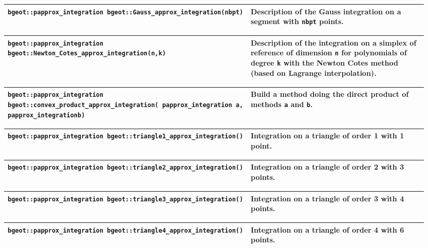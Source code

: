 \begin{center} \begin{tabular}{|m{0.55\linewidth}|m{0.4\linewidth}|} \hline
{\tt bgeot::papprox\_integration bgeot::Gauss\_approx\_integration(nbpt)} & Description of the Gauss integration on a segment with {\tt nbpt} points. \\ \hline
\end{tabular}  
\begin{tabular}{|m{0.55\linewidth}|m{0.4\linewidth}|} \hline
{\tt bgeot::papprox\_integration bgeot::Newton\_Cotes\_approx\_integration(n,\;k)} & Description of the integration on a simplex of reference of dimension {\tt n} for polynomials of degree {\tt k} with the Newton Cotes method (based on Lagrange interpolation).\\ \hline
\end{tabular}  
\begin{tabular}{|m{0.55\linewidth}|m{0.4\linewidth}|} \hline
{\tt bgeot::papprox\_integration bgeot::convex\_product\_approx\_integration( papprox\_integration a, papprox\_integration\;b)} & Build a method doing the direct product of methods {\tt a} and {\tt b}. \\ \hline
\end{tabular}  
\begin{tabular}{|m{0.55\linewidth}|m{0.4\linewidth}|} \hline
{\tt bgeot::papprox\_integration bgeot::triangle1\_approx\_integration()} & Integration on a triangle of order 1 with 1 point. \\ \hline
\end{tabular}  
\begin{tabular}{|m{0.55\linewidth}|m{0.4\linewidth}|} \hline
{\tt bgeot::papprox\_integration bgeot::triangle2\_approx\_integration()} & Integration on a triangle of order 2 with 3 points. \\ \hline
\end{tabular}  
\begin{tabular}{|m{0.55\linewidth}|m{0.4\linewidth}|} \hline
{\tt bgeot::papprox\_integration bgeot::triangle3\_approx\_integration()} & Integration on a triangle of order 3 with 4 points. \\ \hline
\end{tabular}  
\begin{tabular}{|m{0.55\linewidth}|m{0.4\linewidth}|} \hline
{\tt bgeot::papprox\_integration bgeot::triangle4\_approx\_integration()} & Integration on a triangle of order 4 with 6 points. \\ \hline
\end{tabular}  

\end{center}
